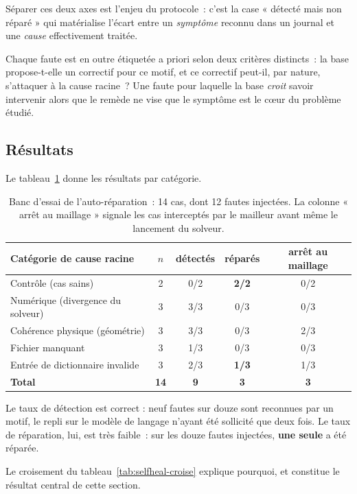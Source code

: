 \documentclass[12pt,a4paper,french]{report}
\begin{document}
Séparer ces deux axes est l'enjeu du protocole~: c'est la case « détecté mais
non réparé » qui matérialise l'écart entre un \emph{symptôme} reconnu dans un
journal et une \emph{cause} effectivement traitée.

Chaque faute est en outre étiquetée a priori selon deux critères distincts~:
la base propose-t-elle un correctif pour ce motif, et ce correctif peut-il, par
nature, s'attaquer à la cause racine~? Une faute pour laquelle la base
\emph{croit} savoir intervenir alors que le remède ne vise que le symptôme est
le c\oe ur du problème étudié.

\subsection{Résultats}

Le tableau~\ref{tab:selfheal} donne les résultats par catégorie.

\begin{table}[htbp]
\centering
\caption[Banc d'essai de l'auto-réparation]{Banc d'essai de l'auto-réparation~: 14 cas, dont 12 fautes injectées.
La colonne « arrêt au maillage » signale les cas interceptés par le mailleur
avant même le lancement du solveur.}
\label{tab:selfheal}
\begin{tabularx}{\textwidth}{@{}Xcccc@{}}
\toprule
\textbf{Catégorie de cause racine} & \textbf{$n$} & \textbf{détectés} &
\textbf{réparés} & \textbf{arrêt au maillage}\\
\midrule
Contrôle (cas sains) & 2 & 0/2 & \textbf{2/2} & 0/2\\
Numérique (divergence du solveur) & 3 & 3/3 & 0/3 & 0/3\\
Cohérence physique (géométrie) & 3 & 3/3 & 0/3 & 2/3\\
Fichier manquant & 3 & 1/3 & 0/3 & 0/3\\
Entrée de dictionnaire invalide & 3 & 2/3 & \textbf{1/3} & 1/3\\
\midrule
\textbf{Total} & \textbf{14} & \textbf{9} & \textbf{3} & \textbf{3}\\
\bottomrule
\end{tabularx}
\end{table}

Le taux de détection est correct : neuf fautes sur douze sont reconnues par un
motif, le repli sur le modèle de langage n'ayant été sollicité que deux fois.
Le taux de réparation, lui, est très faible~: sur les douze fautes injectées,
\textbf{une seule} a été réparée.

Le croisement du tableau~\ref{tab:selfheal-croise} explique pourquoi, et
constitue le résultat central de cette section.
\end{document}
